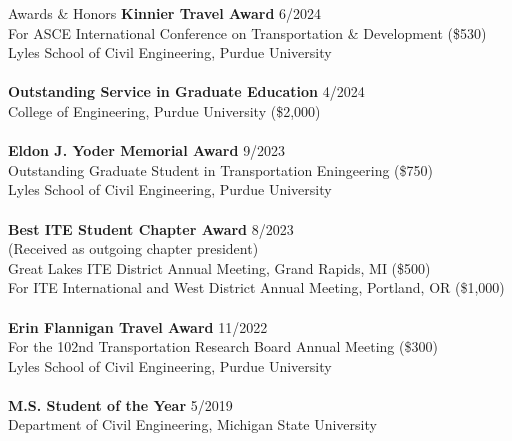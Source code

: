 \documentclass{CV} %
\begin{document}
\begin{rSection}{Awards \& Honors}%
    \textbf{Kinnier Travel Award} \hfill {6/2024}
    \\ For ASCE International Conference on Transportation \& Development (\$530)
    \\ Lyles School of Civil Engineering, Purdue University \\
    \\ \textbf{Outstanding Service in Graduate Education} \hfill {4/2024}
    \\ College of Engineering, Purdue University (\$2,000) \\
    \\ \textbf{Eldon J. Yoder Memorial Award} \hfill {9/2023}
    \\ Outstanding Graduate Student in Transportation Eningeering (\$750)
    \\ Lyles School of Civil Engineering, Purdue University \\
    \\ \textbf{Best ITE Student Chapter Award} \hfill {8/2023}
    \\ (Received as outgoing chapter president)
    \\ Great Lakes ITE District Annual Meeting, Grand Rapids, MI (\$500)
    \\ For ITE International and West District Annual Meeting, Portland, OR (\$1,000) \\
    \\ \textbf{Erin Flannigan Travel Award} \hfill {11/2022}
    \\ For the 102nd Transportation Research Board Annual Meeting (\$300)
    \\ Lyles School of Civil Engineering, Purdue University \\
    \\ \textbf{M.S. Student of the Year} \hfill {5/2019}
    \\ Department of Civil Engineering, Michigan State University \\

\end{rSection}
\end{document}
